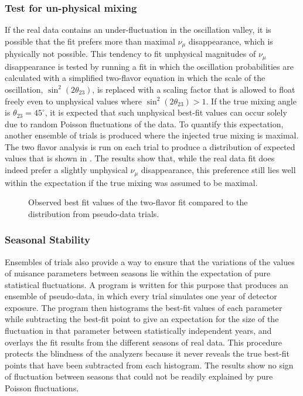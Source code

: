 \subsubsection{Test for un-physical mixing}
If the real data contains an under-fluctuation in the oscillation valley, it is possible that the fit prefers more than maximal $\nu_\mu$ disappearance, which is physically not possible.
This tendency to fit unphysical magnitudes of $\nu_\mu$ disappearance is tested by running a fit in which the oscillation probabilities are calculated with a simplified two-flavor equation in which the scale of the oscillation, $\sin^2(2\theta_{23})$, is replaced with a scaling factor that is allowed to float freely even to unphysical values where $\sin^2(2\theta_{23}) > 1$.
If the true mixing angle is $\theta_{23}=45^\circ$, it is expected that such unphysical best-fit values can occur solely due to random Poisson fluctuations of the data.
To quantify this expectation, another ensemble of trials is produced where the injected true mixing is maximal.
The two flavor analysis is run on each trial to produce a distribution of expected values that is shown in .
The results show that, while the real data fit does indeed prefer a slightly unphysical $\nu_\mu$ disappearance, this preference still lies well within the expectation if the true mixing was assumed to be maximal.

\begin{figure}
    \centering
    
    \caption{Observed best fit values of the two-flavor fit compared to the distribution from pseudo-data trials.}
    \label{fig:two-flavor-ensemble}
\end{figure}

\subsubsection{Seasonal Stability}

Ensembles of trials also provide a way to ensure that the variations of the values of nuisance parameters between seasons lie within the expectation of pure statistical fluctuations.
A program is written for this purpose that produces an ensemble of pseudo-data, in which every trial simulates one year of detector exposure.
The program then histograms the best-fit values of each parameter while subtracting the best-fit point to give an expectation for the size of the fluctuation in that parameter between statistically independent years, and overlays the fit results from the different seasons of real data.
This procedure protects the blindness of the analyzers because it never reveals the true best-fit points that have been subtracted from each histogram.
The results show no sign of fluctuation between seasons that could not be readily explained by pure Poisson fluctuations.



